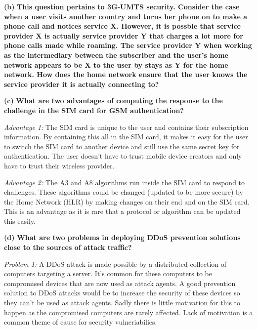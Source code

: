 \documentclass[11pt]{article}
\renewcommand\part[1]{\vspace{.10in}\textbf{(#1)}}
\begin{document}
\part{b} \textbf{This question pertains to 3G-UMTS security. Consider the case when a user visits another country and turns her phone on to make a phone call and notices service X. However, it is possble that service provider X is actually service provider Y that charges a lot more for phone calls made while roaming. The service provider Y when working as the intermediary between the subscriber and the user's home network appears to be X to the user by stays as Y for the home network. How does the home network ensure that the user knows the service provider it is actually connecting to?}



\part{c} \textbf{What are two advantages of computing the response to the challenge in the SIM card for GSM authentication?}

\textit{Advantage 1:} The SIM card is unique to the user and contains their subscription information. By containing this all in the SIM card, it makes it easy for the user to switch the SIM card to another device and still use the same secret key for authentication. The user doesn't have to trust mobile device creators and only have to trust their wireless provider.

\textit{Advantage 2:} The A3 and A8 algorithms run inside the SIM card to respond to challenges. These algorithms could be changed (updated to be more secure) by the Home Network (HLR) by making changes on their end and on the SIM card. This is an advantage as it is rare that a protocol or algorithm can be updated this easily.


\part{d} \textbf{What are two problems in deploying DDoS prevention solutions close to the sources of attack traffic?}

\textit{Problem 1:} A DDoS attack is made possible by a distributed collection of computers targeting a server. It's common for these computers to be compromised devices that are now used as attack agents. A good prevention solution to DDoS attacks would be to increase the security of these devices so they can't be used as attack agents. Sadly there is little motivation for this to happen as the compromised computers are rarely affected. Lack of motivation is a common theme of cause for security vulneriabilies.
\end{document}
